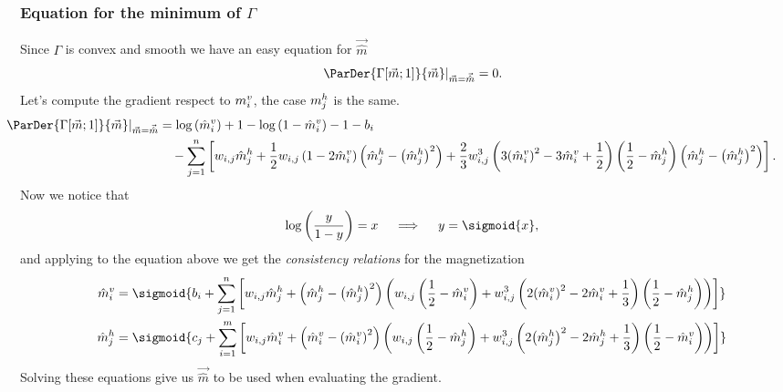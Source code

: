 \subsubsection{Equation for the minimum of \(\Gamma\)}
Since \(\Gamma\) is convex and smooth we have an easy equation for \(\vec{\hat{m}}\)
\[
  \left.\ParDer{\Gam{\vec{m}}{1}}{\vec{m}}\right|_{\vec{m}=\vec{\hat{m}}}=0.
\]
Let's compute the gradient respect to \(m_i^v\), the case \(m_j^h\) is  the same.
\begin{align*}
  \hspace*{-1.2cm}
  \left.\ParDer{\Gam{\vec{m}}{1}}{\vec{m}}\right|_{\vec{m}=\vec{\hat{m}}}
    &= \log\left(\hmvi\right) + 1 - \log\left(1-\hmvi\right) - 1 - b_i \\
    &\quad-\sum_{j=1}^n\left[w_{i,j}\hmhj
      +\frac{1}{2}w_{i,j}\left(1-2\hmvi\right)\left(\hmhj-\hmhjsq\right)
      +\frac{2}{3}w_{i,j}^3\left(3\hmvisq-3\hmvi+\frac{1}{2}\right)\left(\frac{1}{2}-\hmhj\right)
      \left(\hmhj-\hmhjsq\right)\right].
\end{align*}
Now we notice that
\[
  \log{\left(\frac{y}{1-y}\right)} = x \quad \implies \quad y = \sigmoid{x},
\]
and  applying to the equation above we get the \emph{consistency relations} for the magnetization
\begin{align}
  \hmvi&=\sigmoid{b_i + \sum_{j=1}^n\left[w_{i,j}\hmhj+
           \left(\hmhj-\hmhjsq\right)\left(w_{i,j}\left(\frac{1}{2}-\hmvi\right)
           +w_{i,j}^3\left(2\hmvisq-2\hmvi+\frac{1}{3}\right)\left(\frac{1}{2}-\hmhj\right)
           \right)\right]}\\
  \hmhj&=\sigmoid{c_j + \sum_{i=1}^m\left[w_{i,j}\hmvi+
           \left(\hmvi-\hmvisq\right)\left(w_{i,j}\left(\frac{1}{2}-\hmhj\right)
           +w_{i,j}^3\left(2\hmhjsq-2\hmhj+\frac{1}{3}\right)\left(\frac{1}{2}-\hmvi\right)
           \right)\right]}
\end{align}
Solving these equations give us \(\vec{\hat{m}}\) to be used when evaluating the gradient.  
